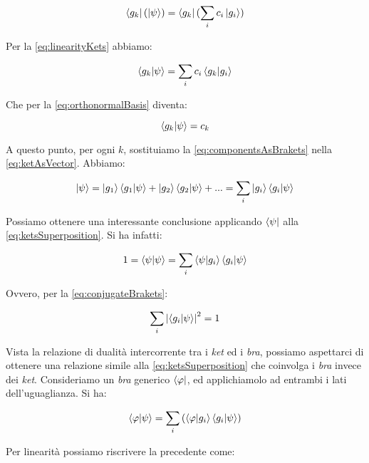 	\begin{equation}
		\bra{g_k}(\ket{\psi}) = \bra{g_k}(\sum_i c_i \ket{g_i})
	\end{equation}

Per la \eqref{eq:linearityKets} abbiamo:

	\begin{equation}
		\braket{g_k}{\psi} = \sum_i c_i \braket{g_k}{g_i}
	\end{equation}

Che per la \eqref{eq:orthonormalBasis} diventa:

	\begin{equation} \label{eq:componentsAsBrakets}
		\braket{g_k}{\psi} = c_k
	\end{equation}

A questo punto, per ogni $k$, sostituiamo la \eqref{eq:componentsAsBrakets} nella \eqref{eq:ketAsVector}. Abbiamo:

	\begin{equation} \label{eq:ketsSuperposition}
		\ket{\psi} = \ket{g_1} \braket{g_1}{\psi} + \ket{g_2} \braket{g_2}{\psi} + ... = \sum_i \ket{g_i} \braket{g_i}{\psi}
	\end{equation}

Possiamo ottenere una interessante conclusione applicando $\bra{\psi}$ alla \eqref{eq:ketsSuperposition}. Si ha infatti:

	\begin{equation}
		1 = \braket{\psi}{\psi} = \sum_i \braket{\psi}{g_i} \braket{g_i}{\psi}
	\end{equation}

Ovvero, per la \eqref{eq:conjugateBrakets}:

	\begin{equation} \label{eq:probabilitySum}
		\sum_i \left | \braket{g_i}{\psi} \right |^2 = 1
	\end{equation}

Vista la relazione di dualità intercorrente tra i \textit{ket} ed i \textit{bra}, possiamo aspettarci di ottenere una relazione simile alla \eqref{eq:ketsSuperposition} che coinvolga i \textit{bra} invece dei \textit{ket}. Consideriamo un \textit{bra} generico $\bra{\varphi}$, ed applichiamolo ad entrambi i lati dell'uguaglianza. Si ha:

	\begin{equation}
		\braket{\varphi}{\psi} = \sum_i \left( \braket{\varphi}{g_i} \braket{g_i}{\psi} \right)
	\end{equation}

Per linearità possiamo riscrivere la precedente come:


